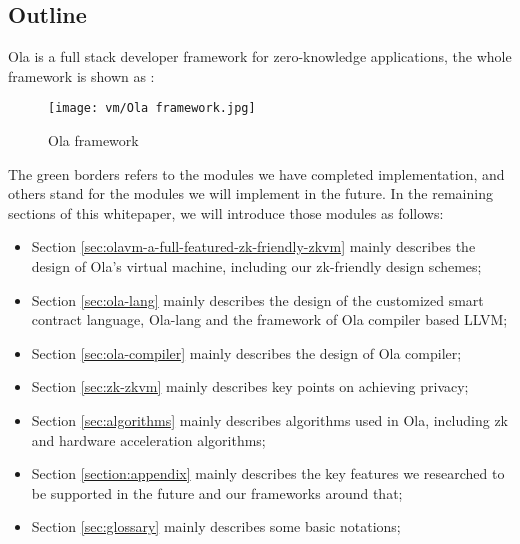 \subsection{Outline}

Ola is a full stack developer framework for zero-knowledge applications, the whole framework is shown as :
\begin{figure}[!ht]
    \centering
    \texttt{[image: vm/Ola framework.jpg]}
    \caption{Ola framework}
    \label{fig:Ola framework}
\end{figure}

The green borders refers to the modules we have completed implementation, and others stand for the modules we will implement in the future. In the remaining sections of this whitepaper, we will introduce those modules 
as follows:
\begin{itemize}
    \item Section \ref{sec:olavm-a-full-featured-zk-friendly-zkvm} mainly describes the design of Ola's virtual machine, including our zk-friendly design schemes;
    \item Section \ref{sec:ola-lang} mainly describes the design of the customized smart contract language, Ola-lang and the framework of Ola compiler based LLVM;
    \item Section \ref{sec:ola-compiler} mainly describes the design of Ola compiler;
    \item Section \ref{sec:zk-zkvm} mainly describes key points on achieving privacy;
    \item Section \ref{sec:algorithms} mainly describes algorithms used in Ola, including zk and hardware acceleration algorithms;
    \item Section \ref{section:appendix} mainly describes the key features we researched to be supported in the future and our frameworks around that;
    \item Section \ref{sec:glossary} mainly describes some basic notations;
\end{itemize}

